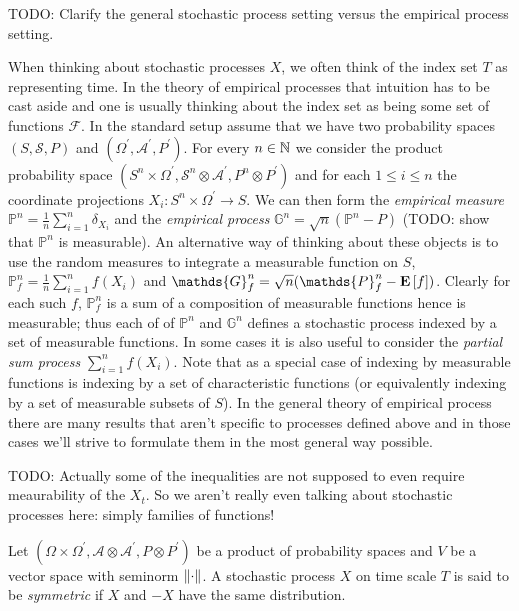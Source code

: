 TODO: Clarify the general stochastic process setting versus the empirical process setting.  

When thinking about stochastic processes $X$, we often think of the index set $T$ as representing time.  In the theory of empirical processes that intuition has to be cast aside and one is usually thinking about the index set as being some set of functions $\mathcal{F}$.  In the standard setup assume that we have two probability spaces $(S, \mathcal{S}, P)$ and $(\Omega^\prime, \mathcal{A}^\prime, P^\prime)$.  For every $n \in \mathbb{N}$ we consider the product probability space
$(S^n \times \Omega^\prime, \mathcal{S}^n \otimes \mathcal{A}^\prime, P^n \otimes P^\prime)$ and for each $1 \leq i \leq n$ the coordinate projections $X_i : S^n \times \Omega^\prime \to S$.  We can then form the \emph{empirical measure} $\mathds{P}^n = \frac{1}{n} \sum_{i=1}^n \delta_{X_i}$ and the \emph{empirical process} 
$\mathds{G}^n = \sqrt{n}( \mathds{P}^n - P)$ (TODO: show that $\mathds{P}^n$ is measurable).  An alternative way of thinking about these objects is to use the random measures to integrate a measurable function on $S$, $\mathds{P}^n_f = \frac{1}{n} \sum_{i=1}^n f(X_i)$ and $\mathds{G}^n_f = \sqrt{n}(\mathds{P}^n_f - \expectation{f})$.  Clearly for each such $f$, $\mathds{P}^n_f$ is a sum of a composition of measurable functions hence is measurable; thus each of of $\mathds{P}^n$ and $\mathds{G}^n$ defines a stochastic process indexed by a set of measurable functions.  In some cases it is also useful to consider the \emph{partial sum process} $\sum_{i=1}^n f(X_i)$.   Note that as a special case of indexing by measurable functions is indexing by a set of characteristic functions (or equivalently indexing by a set of measurable subsets of $S$).  In the general theory of empirical process there are many results that aren't specific to processes defined above and in those cases we'll strive to formulate them in the most general way possible.

TODO: Actually some of the inequalities are not supposed to even require meaurability of the $X_t$.  So we aren't really even talking about stochastic processes here: simply families of functions!

\begin{defn}Let $(\Omega \times \Omega^\prime, \mathcal{A} \otimes \mathcal{A}^\prime, P \otimes P^\prime)$ be a product of probability spaces and $V$ be a vector space with seminorm $\left \lVert \cdot \right \rVert$.  A stochastic process $X$ on time scale $T$ is said to be \emph{symmetric} if $X$ and $-X$ have the same distribution.
\end{defn}

